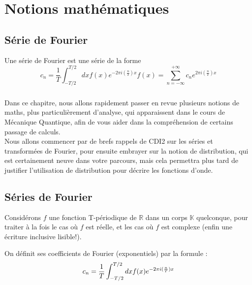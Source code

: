 \documentclass[../notesdecours.tex]{subfiles}
\begin{document}
\chapter{Notions mathématiques}
\section{Série de Fourier}
Une série de Fourier est une série de la forme
\begin{subequations}
\begin{equation}
c_n = \frac{1}{T} \int^{T/2}_{-T/2} dx f(x)e^{-2\pi i(\frac{n}{T})x}
\end{equation}
\begin{equation}
f(x) = \sum_{n = -\infty}^{+\infty}c_ne^{2\pi i (\frac{n}{T})x}
\end{equation}
\end{subequations}

\paragraph{} Dans ce chapitre, nous allons rapidement passer en revue plusieurs notions de maths, 
plus particulièrement d'analyse, qui apparaissent dans le cours de Mécanique Quantique, 
afin de vous aider dans la compréhension de certains passage de calculs. \\

Nous allons commencer par de brefs rappels de CDI2 sur les séries et transformées de Fourier, 
pour ensuite embrayer sur la notion de distribution, qui est certainement neuve dans votre parcours,
mais cela permettra plus tard de justifier l'utilisation de distribution pour décrire les fonctions d'onde. \\

\section{Séries de Fourier}
Considérons $f$ une fonction T-périodique de $\mathbb{R}$ dans un corps $\mathbb{K}$ quelconque, pour traiter à la fois le cas où $f$ est réelle, et les cas où $f$ est complexe (enfin une écriture inclusive lisible!).\\

\begin{definition}
    On définit ses coefficients de Fourier (exponentiels) par la formule : 
\begin{equation}
c_n = \frac{1}{T} \int^{T/2}_{-T/2} dx f(x)e^{-2\pi i(\frac{n}{T})x} \\
\end{equation}
\end{definition}
\end{document}
